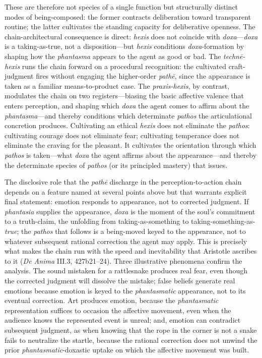 These are therefore not species of a single function but structurally distinct modes of being-composed: the former contracts deliberation toward transparent routine; the latter cultivates the standing capacity for deliberative openness. The chain-architectural consequence is direct: \textit{hexis} does not coincide with \textit{doxa}---\textit{doxa} is a taking-as-true, not a disposition---but \textit{hexis} conditions \textit{doxa}-formation by shaping how the \textit{phantasma} appears to the agent as good or bad. The \textit{technē-hexis} runs the chain forward on a procedural recognition: the cultivated craft-judgment fires without engaging the higher-order \textit{pathē}, since the appearance is taken as a familiar means-to-product case. The \textit{praxis-hexis}, by contrast, modulates the chain on two registers---biasing the basic affective valence that enters perception, and shaping which \textit{doxa} the agent comes to affirm about the \textit{phantasma}---and thereby conditions which determinate \textit{pathos} the articulational concretion produces. Cultivating an ethical \textit{hexis} does not eliminate the \textit{pathos}: cultivating courage does not eliminate fear; cultivating temperance does not eliminate the craving for the pleasant. It cultivates the orientation through which \textit{pathos} is taken---what \textit{doxa} the agent affirms about the appearance---and thereby the determinate species of \textit{pathos} (or its principled mastery) that issues.

The disclosive role that the \textit{pathē} discharge in the perception-to-action chain depends on a feature named at several points above but that warrants explicit final statement: emotion responds to appearance, not to corrected judgment. If \textit{phantasia} supplies the appearance, \textit{doxa} is the moment of the soul's commitment to a truth-claim, the unfolding from taking-as-something to taking-something-as-\textit{true}; the \textit{pathos} that follows is a being-moved keyed to the appearance, not to whatever subsequent rational correction the agent may apply. This is precisely what makes the chain run with the speed and inevitability that Aristotle ascribes to it (\textit{De Anima} III.3, 427b21--24). Three illustrative phenomena confirm the analysis. The sound mistaken for a rattlesnake produces real fear, even though the corrected judgment will dissolve the mistake; false beliefs generate real emotions because emotion is keyed to the \textit{phantasmatic} appearance, not to its eventual correction. Art produces emotion, because the \textit{phantasmatic} representation suffices to occasion the affective movement, even when the audience knows the represented event is unreal; and, emotion can contradict subsequent judgment, as when knowing that the rope in the corner is not a snake fails to neutralize the startle, because the rational correction does not unwind the prior \textit{phantasmatic}-doxastic uptake on which the affective movement was built.

